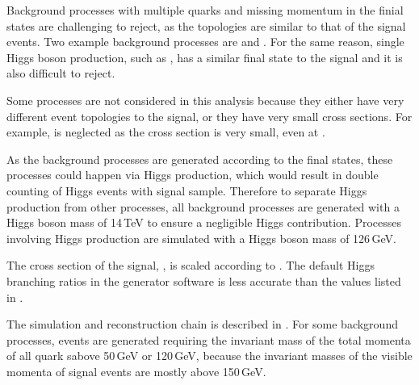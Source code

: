 
Background processes with multiple quarks and missing momentum in the finial states are challenging to reject, as the topologies are similar to that of the signal events. Two example background processes are \eeTo{ \Pquark \Pquark \Pquark \Pquark \Pnu \APnu} and \HepProcess{\Pepm\Pphoton \to \Pnu \Pquark \Pquark \Pquark \Pquark}. For the same reason, single Higgs boson production, such as \eeTo{\Pquark \Pquark \PHiggs \Pnu \APnu}, has a similar final state to the signal and it is also difficult to reject.

Some processes are not considered in this analysis because they either have very different event topologies to the signal, or they have very small cross sections. For example,  \HepProcess{\Egamma   \to \Pquark \Pquark \PHiggs \Plepton} is neglected  as the cross section is very small, even at .

As the background processes are generated according to the final states, these processes could happen via Higgs production, which would result in double counting of Higgs events with signal sample.  Therefore to separate Higgs production from other processes, all background processes are generated with a Higgs boson mass of 14\,TeV to ensure a negligible Higgs contribution. Processes involving Higgs production are simulated with a Higgs boson mass of 126\,GeV.

The cross section of the signal, \eeToHHbbWW, is scaled according to \cite{Dittmaier:2012vm}. The default Higgs branching ratios in the generator software is less accurate than the values listed in \cite{Dittmaier:2012vm}.


The simulation and reconstruction chain is described in . For some background processes, events are generated requiring the invariant mass of the total momenta of all quark sabove 50\,GeV or 120\,GeV, because the invariant masses of the visible momenta of signal events are mostly above 150\,GeV.

